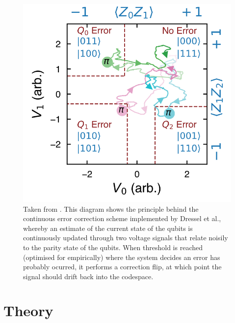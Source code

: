 \documentclass{report}
\begin{document}
\begin{figure}[ht]
    \centering
    \includegraphics[scale = 0.3]{Figures/dresseldiagram.png}
    \caption{Taken from \cite{Dressel2022}. This diagram shows the principle behind the continuous error correction scheme implemented by Dressel et al., whereby an estimate of the current state of the qubits is continuously updated through two voltage signals that relate noisily to the parity state of the qubits. When threshold is reached (optimised for empirically) where the system decides an error has probably ocurred, it performs a correction flip, at which point the signal should drift back into the codespace.}
    \label{fig:dresseldiagram}
\end{figure}


\chapter{Theory}
\end{document}
